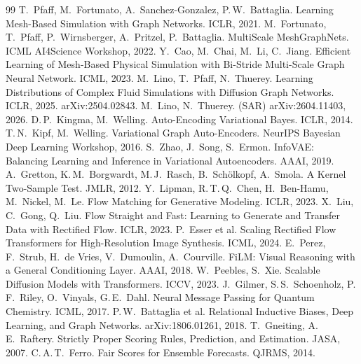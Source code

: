 \documentclass[11pt]{article}
\begin{document}
\begin{thebibliography}{99}
 T.~Pfaff, M.~Fortunato, A.~Sanchez-Gonzalez, P.\,W.~Battaglia.
  Learning Mesh-Based Simulation with Graph Networks. ICLR, 2021.
 M.~Fortunato, T.~Pfaff, P.~Wirnsberger, A.~Pritzel, P.~Battaglia.
  MultiScale MeshGraphNets. ICML AI4Science Workshop, 2022.
 Y.~Cao, M.~Chai, M.~Li, C.~Jiang.
  Efficient Learning of Mesh-Based Physical Simulation with Bi-Stride Multi-Scale Graph Neural Network. ICML, 2023.
 M.~Lino, T.~Pfaff, N.~Thuerey.
  Learning Distributions of Complex Fluid Simulations with Diffusion Graph Networks. ICLR, 2025. arXiv:2504.02843.
 M.~Lino, N.~Thuerey. (SAR) arXiv:2604.11403, 2026.
 D.\,P.~Kingma, M.~Welling. Auto-Encoding Variational Bayes. ICLR, 2014.
 T.\,N.~Kipf, M.~Welling. Variational Graph Auto-Encoders.
  NeurIPS Bayesian Deep Learning Workshop, 2016.
 S.~Zhao, J.~Song, S.~Ermon. InfoVAE: Balancing Learning and
  Inference in Variational Autoencoders. AAAI, 2019.
 A.~Gretton, K.\,M.~Borgwardt, M.\,J.~Rasch, B.~Sch\"olkopf, A.~Smola.
  A Kernel Two-Sample Test. JMLR, 2012.
 Y.~Lipman, R.\,T.\,Q.~Chen, H.~Ben-Hamu, M.~Nickel, M.~Le.
  Flow Matching for Generative Modeling. ICLR, 2023.
 X.~Liu, C.~Gong, Q.~Liu. Flow Straight and Fast: Learning to
  Generate and Transfer Data with Rectified Flow. ICLR, 2023.
 P.~Esser et al. Scaling Rectified Flow Transformers for
  High-Resolution Image Synthesis. ICML, 2024.
 E.~Perez, F.~Strub, H.~de Vries, V.~Dumoulin, A.~Courville.
  FiLM: Visual Reasoning with a General Conditioning Layer. AAAI, 2018.
 W.~Peebles, S.~Xie. Scalable Diffusion Models with
  Transformers. ICCV, 2023.
 J.~Gilmer, S.\,S.~Schoenholz, P.\,F.~Riley, O.~Vinyals, G.\,E.~Dahl.
  Neural Message Passing for Quantum Chemistry. ICML, 2017.
 P.\,W.~Battaglia et al. Relational Inductive Biases,
  Deep Learning, and Graph Networks. arXiv:1806.01261, 2018.
 T.~Gneiting, A.\,E.~Raftery. Strictly Proper Scoring
  Rules, Prediction, and Estimation. JASA, 2007.
 C.\,A.\,T.~Ferro. Fair Scores for Ensemble Forecasts.
  QJRMS, 2014.
\end{thebibliography}

\appendix
\end{document}
